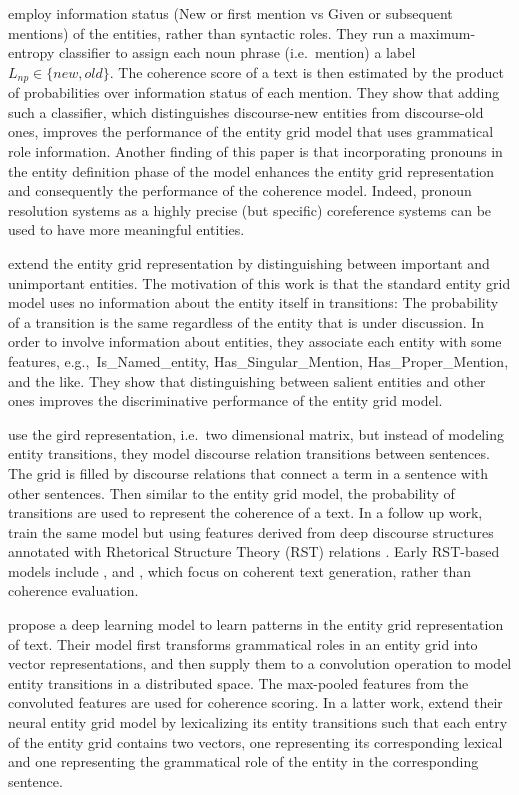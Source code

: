  employ information status (New or first mention vs Given or subsequent mentions) of the entities, rather than syntactic roles. 
They run a maximum-entropy classifier to assign each noun phrase (i.e.\ mention) a label $L_{np} \in \lbrace new, old \rbrace$. 
The coherence score of a text is then estimated by the product of probabilities over information status of each mention. 
They show that adding such a classifier, which distinguishes discourse-new entities from discourse-old ones, improves the performance of the entity grid model that uses grammatical role information.  
Another finding of this paper is that incorporating pronouns in the entity definition phase of the model enhances the entity grid representation and consequently the performance of the coherence model. 
Indeed, pronoun resolution systems as a highly precise (but specific) coreference systems can be used to have more meaningful entities. 

 extend the entity grid representation by distinguishing between important and unimportant entities. 
The motivation of this work is that the standard entity grid model uses no information about the entity itself in transitions: The probability of a transition is the same regardless of the entity that is under discussion. 
In order to involve information about entities, they associate each entity with some features, e.g.,\ Is\_Named\_entity, Has\_Singular\_Mention, Has\_Proper\_Mention, and the like. 
They show that distinguishing between salient entities and other ones improves the discriminative performance of the entity grid model. 

 use the gird representation, i.e.\ two dimensional matrix, but instead of modeling entity transitions, they model discourse relation transitions between sentences. 
The grid is filled by discourse relations that connect a term in a sentence with other sentences. 
Then similar to the entity grid model, the probability of transitions are used to represent the coherence of a text. 
In a follow up work,  train the same model but using features derived from deep discourse structures annotated with Rhetorical Structure Theory (RST) relations \cite{mann88,prasad08a}. 
Early RST-based models include , and , which focus on coherent text generation, rather than coherence evaluation.

 propose a deep learning model to learn patterns in the entity grid representation of text. 
Their model first transforms grammatical roles in an entity grid into vector representations, and then supply them to a convolution operation to model entity transitions in a distributed space. 
The max-pooled features from the convoluted features are used for coherence scoring. 
In a latter work,  extend their neural entity grid model by lexicalizing its entity transitions such that each entry of the entity grid contains two vectors, one representing its corresponding lexical and one representing the grammatical role of the entity in the corresponding sentence.  

